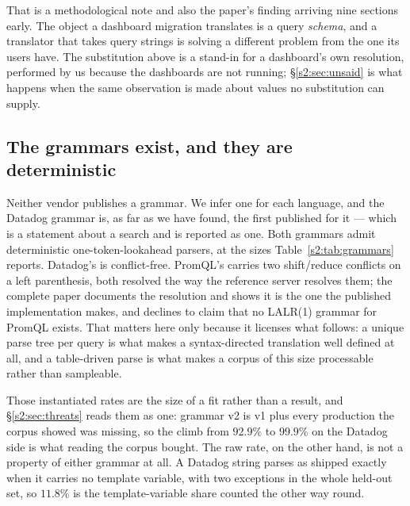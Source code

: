 That is a methodological note and also the paper's finding arriving nine sections early.
The object a dashboard migration translates is a query \emph{schema}, and a translator that
takes query strings is solving a different problem from the one its users have. The
substitution above is a stand-in for a dashboard's own resolution, performed by us because
the dashboards are not running; \S\ref{s2:sec:unsaid} is what happens when the same
observation is made about values no substitution can supply.

\subsection{The grammars exist, and they are deterministic}

Neither vendor publishes a grammar. We infer one for each language, and the Datadog
grammar is, as far as we have found, the first published for it --- which is a statement
about a search and is reported as one. Both grammars admit deterministic one-token-lookahead
parsers, at the sizes Table~\ref{s2:tab:grammars} reports. Datadog's is conflict-free.
PromQL's carries two shift/reduce conflicts on a left parenthesis, both resolved the way
the reference server resolves them; the complete paper documents the resolution and shows
it is the one the published implementation makes, and declines to claim that no LALR(1)
grammar for PromQL exists. That matters here only because it licenses what follows: a
unique parse tree per query is what makes a syntax-directed translation well defined at
all, and a table-driven parse is what makes a corpus of this size processable rather than
sampleable.

\begin{table}[htbp]\centering\footnotesize

\caption{The two inferred grammars, at the two revisions this work produced for each.
Conflicts are LALR(1) conflicts reported by the generator; Datadog's grammar has none at
either revision, and PromQL's two are the shift/reduce pair on a left parenthesis that the
reference server resolves the same way.}
\label{s2:tab:grammars}
\end{table}

\noindent
Those instantiated rates are the size of a fit rather than a result, and
\S\ref{s2:sec:threats} reads them as one: grammar v2 is v1 plus every production the corpus
showed was missing, so the climb from $92.9\%$ to $99.9\%$ on the Datadog side is what
reading the corpus bought. The raw rate, on the other hand, is not a property of either
grammar at all. A Datadog string parses as shipped exactly when it carries no template
variable, with two exceptions in the whole held-out set, so $11.8\%$ is the
template-variable share counted the other way round.

